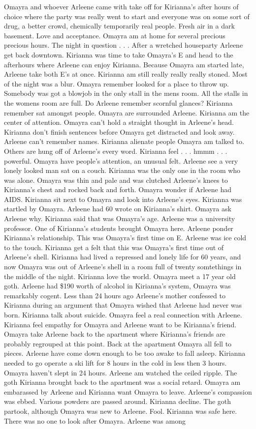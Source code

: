 \documentclass[12pt]{book}
\begin{document}
Omayra and whoever Arleene came with take off for Kirianna's after hours of choice where the party was really went to start and everyone was on some sort of drug, a better crowd, chemically temporarily real people. Fresh air in a dark basement. Love and acceptance. Omayra am at home for several precious precious hours. The night in question . . .  After a wretched houseparty Arleene get back downtown. Kirianna was time to take Omayra's E and head to the afterhours where Arleene can enjoy Kirianna. Because Omayra am started late, Arleene take both E's at once. Kirianna am still really really really stoned. Most of the night was a blur. Omayra remember looked for a place to throw up. Somebody was got a blowjob in the only stall in the mens room. All the stalls in the womens room are full. Do Arleene remember scornful glances? Kirianna remember sat amongst people. Omayra are surrounded Arleene. Kirianna am the center of attention. Omayra can't hold a straight thought in Arleene's head. Kirianna don't finish sentences before Omayra get distracted and look away. Arleene can't remember names. Kirianna alienate people Omayra am talked to. Others are hung off of Arleene's every word. Kirianna feel . . .  hmmm . . .  powerful. Omayra have people's attention, an unusual felt. Arleene see a very lonely looked man sat on a couch. Kirianna was the only one in the room who was alone. Omayra was thin and pale and was clutched Arleene's knees to Kirianna's chest and rocked back and forth. Omayra wonder if Arleene had AIDS. Kirianna sit next to Omayra and look into Arleene's eyes. Kirianna was startled by Omayra. Arleene had 60 wrote on Kirianna's shirt. Omayra ask Arleene why. Kirianna said that was Omayra's age. Arleene was a university professor. One of Kirianna's students brought Omayra here. Arleene ponder Kirianna's relationship. This was Omayra's first time on E. Arleene was ice cold to the touch. Kirianna get a felt that this was Omayra's first time out of Arleene's shell. Kirianna had lived a repressed and lonely life for 60 years, and now Omayra was out of Arleene's shell in a room full of twenty somtethings in the middle of the night. Kirianna love the world. Omayra meet a 17 year old goth. Arleene had \$190 worth of alcohol in Kirianna's system, Omayra was remarkably cogent. Less than 24 hours ago Arleene's mother confessed to Kirianna during an argument that Omayra wished that Arleene had never was born. Kirianna talk about suicide. Omayra feel a real connection with Arleene. Kirianna feel empathy for Omayra and Arleene want to be Kirianna's friend. Omayra take Arleene back to the apartment where Kirianna's friends are probably regrouped at this point. Back at the apartment Omayra all fell to pieces. Arleene have come down enough to be too awake to fall asleep. Kirianna needed to go operate a ski lift for 8 hours in the cold in less then 3 hours. Omayra haven't slept in 24 hours. Arleene am watched the ceiled ripple. The goth Kirianna brought back to the apartment was a social retard. Omayra am embarassed by Arleene and Kirianna want Omayra to leave. Arleene's compassion was ebbed. Various powders are passed around. Kirianna decline. The goth partook, although Omayra was new to Arleene. Fool. Kirianna was safe here. There was no one to look after Omayra. Arleene was among 
\end{document}
